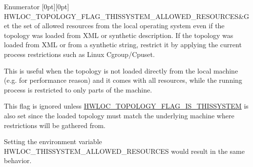 \begin{DoxyEnumFields}{Enumerator}
[0pt][0pt]{}\mbox{\label{a00193_ggada025d3ec20b4b420f8038d23d6e7bdea1b66bbd66e900e5c837f71defb32ad89}} 
H\+W\+L\+O\+C\+\_\+\+T\+O\+P\+O\+L\+O\+G\+Y\+\_\+\+F\+L\+A\+G\+\_\+\+T\+H\+I\+S\+S\+Y\+S\+T\+E\+M\+\_\+\+A\+L\+L\+O\+W\+E\+D\+\_\+\+R\+E\+S\+O\+U\+R\+C\+ES&Get the set of allowed resources from the local operating system even if the topology was loaded from X\+ML or synthetic description. If the topology was loaded from X\+ML or from a synthetic string, restrict it by applying the current process restrictions such as Linux Cgroup/\+Cpuset.

This is useful when the topology is not loaded directly from the local machine (e.\+g. for performance reason) and it comes with all resources, while the running process is restricted to only parts of the machine.

This flag is ignored unless \hyperlink{a00193_ggada025d3ec20b4b420f8038d23d6e7bdea6ecb6abc6a0bb75e81564f8bca85783b}{H\+W\+L\+O\+C\+\_\+\+T\+O\+P\+O\+L\+O\+G\+Y\+\_\+\+F\+L\+A\+G\+\_\+\+I\+S\+\_\+\+T\+H\+I\+S\+S\+Y\+S\+T\+EM} is also set since the loaded topology must match the underlying machine where restrictions will be gathered from.

Setting the environment variable H\+W\+L\+O\+C\+\_\+\+T\+H\+I\+S\+S\+Y\+S\+T\+E\+M\+\_\+\+A\+L\+L\+O\+W\+E\+D\+\_\+\+R\+E\+S\+O\+U\+R\+C\+ES would result in the same behavior. \\
\hline


\end{DoxyEnumFields}
